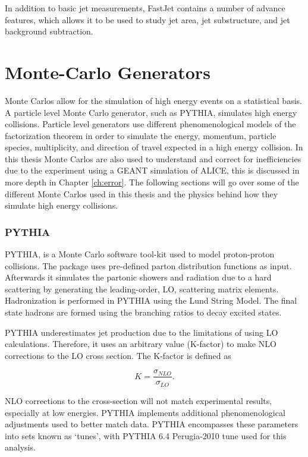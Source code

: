 \noindent
In addition to basic jet measurements, FastJet contains a number of advance features, which allows it to be used to study jet area, jet substructure, and jet background subtraction\cite{Connors:2017ptx}.

\section{Monte-Carlo Generators}
Monte Carlos allow for the simulation of high energy events on a statistical basis.  A particle level Monte Carlo generator, such as PYTHIA, simulates high energy collisions.  Particle level generators use different phenomenological models of the factorization theorem in order to simulate the energy, momentum, particle species, multiplicity, and direction of travel expected in a high energy collision.  In this thesis Monte Carlos are also used to understand and correct for inefficiencies due to the experiment using a GEANT simulation of ALICE, this is discussed in more depth in Chapter \ref{ch:error}.  The following sections will go over some of the different Monte Carlos used in this thesis and the physics behind how they simulate high energy collisions.

\subsubsection{PYTHIA}

PYTHIA\cite{Sjostrand:2007gs}, is a Monte Carlo software tool-kit used to model proton-proton collisions.  The package uses pre-defined parton distribution functions as input.  Afterwards it simulates the partonic showers and radiation due to a hard scattering by generating the leading-order, LO, scattering matrix elements.  Hadronization is performed in PYTHIA using the Lund String Model.  The final state hadrons are formed using the branching ratios to decay excited states.

PYTHIA underestimates jet production due to the limitations of using LO calculations.  Therefore, it uses an arbitrary value (K-factor) to make NLO corrections to the LO cross section.  The K-factor is defined as

\begin{equation}
K = \frac{\sigma_{NLO}}{\sigma_{LO}}.
\label{eq:Kfactor}
\end{equation}

NLO corrections to the cross-section will not match experimental results, especially at low energies.  PYTHIA implements additional phenomenological adjustments used to better match data.  PYTHIA encompasses these parameters into sets known as `tunes', with PYTHIA 6.4 Perugia-2010 tune used for this analysis\cite{Skands:2010ak}.

